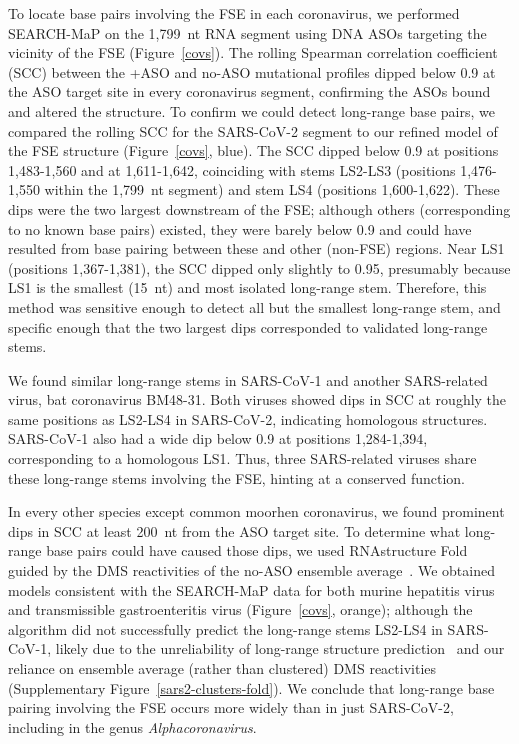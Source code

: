 \documentclass[main.tex]{subfiles}
\begin{document}
To locate base pairs involving the FSE in each coronavirus, we performed SEARCH-MaP on the 1,799~nt RNA segment using DNA ASOs targeting the vicinity of the FSE (Figure~\ref{covs}).
The rolling Spearman correlation coefficient (SCC) between the +ASO and no-ASO mutational profiles dipped below 0.9 at the ASO target site in every coronavirus segment, confirming the ASOs bound and altered the structure.
To confirm we could detect long-range base pairs, we compared the rolling SCC for the SARS-CoV-2 segment to our refined model of the FSE structure (Figure~\ref{covs}, blue).
The SCC dipped below 0.9 at positions 1,483-1,560 and at 1,611-1,642, coinciding with stems LS2-LS3 (positions 1,476-1,550 within the 1,799~nt segment) and stem LS4 (positions 1,600-1,622).
These dips were the two largest downstream of the FSE; although others (corresponding to no known base pairs) existed, they were barely below 0.9 and could have resulted from base pairing between these and other (non-FSE) regions.
Near LS1 (positions 1,367-1,381), the SCC dipped only slightly to 0.95, presumably because LS1 is the smallest (15~nt) and most isolated long-range stem.
Therefore, this method was sensitive enough to detect all but the smallest long-range stem, and specific enough that the two largest dips corresponded to validated long-range stems.

We found similar long-range stems in SARS-CoV-1 and another SARS-related virus, bat coronavirus BM48-31.
Both viruses showed dips in SCC at roughly the same positions as LS2-LS4 in SARS-CoV-2, indicating homologous structures.
SARS-CoV-1 also had a wide dip below 0.9 at positions 1,284-1,394, corresponding to a homologous LS1.
Thus, three SARS-related viruses share these long-range stems involving the FSE, hinting at a conserved function.

In every other species except common moorhen coronavirus, we found prominent dips in SCC at least 200~nt from the ASO target site.
To determine what long-range base pairs could have caused those dips, we used RNAstructure Fold~\cite{Reuter2010} guided by the DMS reactivities of the no-ASO ensemble average~\cite{Cordero2012}.
We obtained models consistent with the SEARCH-MaP data for both murine hepatitis virus and transmissible gastroenteritis virus (Figure~\ref{covs}, orange); although the algorithm did not successfully predict the long-range stems LS2-LS4 in SARS-CoV-1, likely due to the unreliability of long-range structure prediction~\cite{Nicholson2015} and our reliance on ensemble average (rather than clustered) DMS reactivities (Supplementary Figure~\ref{sars2-clusters-fold}).
We conclude that long-range base pairing involving the FSE occurs more widely than in just SARS-CoV-2, including in the genus \textit{Alphacoronavirus}.
\end{document}
